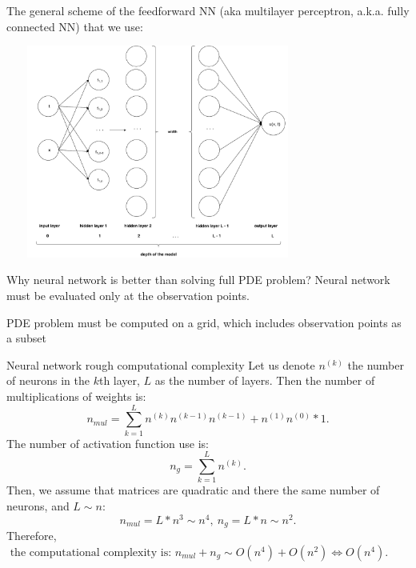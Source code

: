 \documentclass{beamer}
\begin{document}
\begin{frame}
The general scheme of the feedforward NN (aka multilayer perceptron, a.k.a. fully connected NN) that we use:

\vspace{0.5cm}
\centering
\includegraphics[width = 10cm , height = 7cm]{images/FFNN}
\end{frame}

\begin{frame}{Why neural network is better than solving full PDE problem?}
Neural network must be evaluated only at the observation points.

PDE problem must be computed on a grid, which includes observation points as a subset
\end{frame}

\begin{frame}{Neural network rough computational complexity}
    Let us denote $n^{(k)}$ the number of neurons in the $k$th layer, $L$ as the number of layers. Then the number of multiplications of weights is: $$n_{mul} = \sum_{k=1}^{L} n^{(k)}n^{(k-1)}n^{(k-1)} + n^{(1)}n^{(0)}*1.$$
    The number of activation function use is: $$n_g = \sum_{k = 1}^{L} n^{(k)}.$$     
    Then, we assume that matrices are quadratic and there the same number of neurons, and $L \sim n$:
    $$n_{mul} = L*n^3 \sim n^4, ~ n_g = L*n \sim n^2.$$
    Therefore, $ \text{ the computational complexity is: }  n_{mul} + n_g \sim O(n^4) + O(n^2) \Longleftrightarrow O(n^4).$ 
\end{frame}
\end{document}
